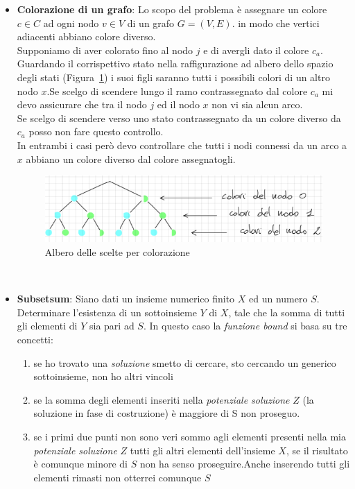 \documentclass[a4paper]{article}
\begin{document}
\begin{itemize}
	\item \textbf{Colorazione di un grafo}: Lo scopo del problema è assegnare un colore $c \in C$ ad ogni nodo $v \in V$ di un grafo $G=(V,E)$. in modo che vertici adiacenti abbiano colore diverso.\\
	Supponiamo di aver colorato fino al nodo $j$ e di avergli dato il colore $c_a$.
	Guardando il corrispettivo stato nella raffigurazione ad albero dello spazio degli stati (Figura~\ref{FIG:B2_colorazione}) i suoi figli saranno tutti i possibili colori di un altro nodo $x$.Se scelgo di scendere lungo il ramo contrassegnato dal colore $c_a$ mi devo assicurare che tra il nodo $j$ ed il nodo $x$ non vi sia alcun arco.\\
Se scelgo di scendere verso uno stato contrassegnato da un colore diverso da $c_a$ posso non fare questo controllo.\\
In entrambi i casi però devo controllare che tutti i nodi connessi da un arco a $x$ abbiano un colore diverso dal colore assegnatogli.\\
\begin{figure}[!ht]
\centering
\includegraphics[width=1\textwidth]{./img/B2_colorazione.png}
\caption{Albero delle scelte per colorazione} \label{FIG:B2_colorazione}
\end{figure}\\

	\item \textbf{Subsetsum}: Siano dati un insieme numerico finito $X$ ed un numero $S$. Determinare l'esistenza di un sottoinsieme $Y$ di $X$, tale che la somma di tutti gli elementi di $Y$ sia pari ad $S$.
		In questo caso la \textit{funzione bound} si basa su tre concetti:
	\begin{enumerate}
		\item se ho trovato una \textit{soluzione} smetto di cercare, sto cercando un generico sottoinsieme, non ho altri vincoli
		\item se la somma degli elementi inseriti nella \textit{potenziale soluzione} $Z$ (la soluzione in fase di costruzione) è maggiore di S non proseguo.
		\item se i primi due punti non sono veri sommo agli elementi presenti nella mia \textit{potenziale soluzione} $Z$ tutti gli altri elementi dell'insieme $X$, se il risultato è comunque minore di $S$ non ha senso proseguire.Anche inserendo tutti gli elementi rimasti non otterrei comunque $S$
	\end{enumerate}
\end{itemize}
\end{document}
